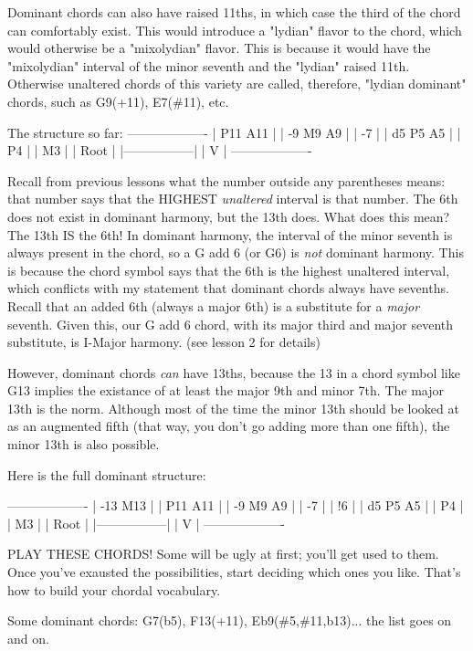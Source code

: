 Dominant chords can also have raised 11ths, in which case the third of the
chord can comfortably exist. This would introduce a "lydian" flavor to the
chord, which would otherwise be a "mixolydian" flavor. This is because it
would have the "mixolydian" interval of the minor seventh and the "lydian"
raised 11th. Otherwise unaltered chords of this variety are called, therefore,
"lydian dominant" chords, such as G9(+11), E7(\#11), etc.

The structure so far:
-------------------
|      P11  A11   |
| -9    M9   A9   |
|       -7        |
|  d5   P5   A5   |
|       P4        |
|       M3        |
|      Root       |
|-----------------|
|        V        |
-------------------

Recall from previous lessons what the number outside any parentheses means:
that number says that the HIGHEST \emph{unaltered} interval is that number. The
6th does not exist in dominant harmony, but the 13th does. What does this
mean? The 13th IS the 6th! In dominant harmony, the interval of the minor
seventh is always present in the chord, so a G add 6 (or G6) is \emph{not} dominant
harmony. This is because the chord symbol says that the 6th is the highest
unaltered interval, which conflicts with my statement that dominant chords
always have sevenths. Recall that an added 6th (always a major 6th) is a
substitute for a \emph{major} seventh. Given this, our G add 6 chord, with its
major third and major seventh substitute, is I-Major harmony. (see lesson
2 for details)

However, dominant chords \emph{can} have 13ths, because the 13 in a chord symbol
like G13 implies the existance of at least the major 9th and minor 7th.
The major 13th is the norm. Although most of the time the minor 13th should
be looked at as an augmented fifth (that way, you don't go adding more than
one fifth), the minor 13th is also possible.

Here is the full dominant structure:

-------------------
| -13  M13        |
|      P11  A11   |
| -9    M9   A9   |
|       -7        |
|       !6        |
|  d5   P5   A5   |
|       P4        |
|       M3        |
|      Root       |
|-----------------|
|        V        |
-------------------

PLAY THESE CHORDS! Some will be ugly at first; you'll get used to them. Once
you've exausted the possibilities, start deciding which ones you like. That's
how to build your chordal vocabulary.

Some dominant chords: G7(b5), F13(+11), Eb9(\#5,\#11,b13)... the list goes on and
on.

